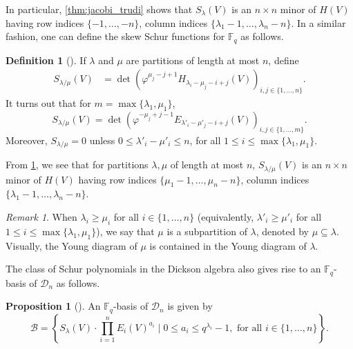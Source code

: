 \documentclass[12pt,a4paper]{report}
\theoremstyle{definition}
\newtheorem{definition}[theorem]{Definition}
\newtheorem{proposition}[theorem]{Proposition}
\theoremstyle{remark}
\newtheorem*{remark}{Remark}
\theoremstyle{definition}
\begin{document}
In particular, \cref{thm:jacobi_trudi} shows that $S_{\lambda}(V)$ is an $n\times n$ minor of $H(V)$ having row indices $\{-1, \ldots, -n\}$, column indices $\{\lambda_1 - 1, \ldots, \lambda_n - n\}$. In a similar fashion, one can define the skew Schur functions for $\mathbb{F}_q$ as follows.
\begin{definition}[{\cite[(7.11), (7.11'), and (7.12)]{macdonald_schur_1992}}]\label{def:skew_schur}
    If $\lambda$ and $\mu$ are partitions of length at most $n$, define
    \begin{align*}
     S_{\lambda/\mu}(V) &= \det(\varphi^{\mu_j-j+1}H_{\lambda_i - \mu_j - i+j}(V))_{i, j\in \{1, \ldots, n\}}.   
    \end{align*}
    It turns out that for $m = \max\{\lambda_1, \mu_1\}$,
    \begin{equation*}
        S_{\lambda/\mu}(V) = \det(\varphi^{-\mu_j+j-1}E_{\lambda'_i - \mu'_j - i+j}(V))_{i, j\in \{1, \ldots, m\}}.
    \end{equation*}
    Moreover, $S_{\lambda/\mu} = 0$ unless $0\leq \lambda'_i -\mu'_i \leq n$, for all $1\leq i\leq \max\{\lambda_1, \mu_1\}$.
\end{definition}
From \cref{def:skew_schur}, we see that for partitions $\lambda, \mu$ of length at most $n$, $S_{\lambda/\mu}(V)$ is an $n\times n$ minor of $H(V)$ having row indices $\{\mu_1-1, \ldots, \mu_n-n\}$, column indices $\{\lambda_1 - 1, \ldots, \lambda_n - n\}$.
\begin{remark}
    When $\lambda_i\geq \mu_i$ for all $i\in \{1, \ldots, n\}$ (equivalently, $\lambda'_i\geq \mu'_i$ for all $1\leq i\leq \max\{\lambda_1, \mu_1\}$), we say that $\mu$ is a subpartition of $\lambda$, denoted by $\mu\subseteq \lambda$. Visually, the Young diagram of $\mu$ is contained in the Young diagram of $\lambda$.
\end{remark}
The class of Schur polynomials in the Dickson algebra also gives rise to an $\mathbb{F}_q$-basis of $\mathcal{D}_n$ as follows.
\begin{proposition}[\cite{stanton_another_2015}]\label{prop:stanton_basis}
    An $\mathbb{F}_q$-basis of $\mathcal{D}_n$ is given by
    \begin{equation*}
        \mathcal{B} =\left\{ S_\lambda(V) \cdot \prod\limits_{i=1}^{n}E_i(V)^{a_i} \mid 0\leq a_i\leq q^{\lambda_i} - 1, \text{ for all } i\in \{1,\ldots, n\} \right\}.
    \end{equation*}
\end{proposition}
\end{document}
